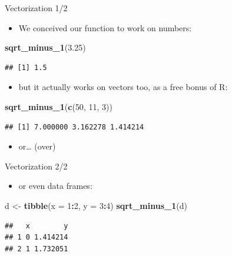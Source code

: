 \documentclass[ignorenonframetext,]{beamer}
\newenvironment{Shaded}{\begin{snugshade}}{\end{snugshade}}
\newcommand{\DataTypeTok}[1]{\textcolor[rgb]{0.13,0.29,0.53}{#1}}
\newcommand{\DecValTok}[1]{\textcolor[rgb]{0.00,0.00,0.81}{#1}}
\newcommand{\FloatTok}[1]{\textcolor[rgb]{0.00,0.00,0.81}{#1}}
\newcommand{\KeywordTok}[1]{\textcolor[rgb]{0.13,0.29,0.53}{\textbf{#1}}}
\newcommand{\NormalTok}[1]{#1}
\newcommand{\OperatorTok}[1]{\textcolor[rgb]{0.81,0.36,0.00}{\textbf{#1}}}
\newcommand{\StringTok}[1]{\textcolor[rgb]{0.31,0.60,0.02}{#1}}
\providecommand{\tightlist}{%
  \setlength{\itemsep}{0pt}\setlength{\parskip}{0pt}}
\begin{document}
\begin{frame}[fragile]{Vectorization 1/2}
\protect\hypertarget{vectorization-12}{}

\begin{itemize}
\tightlist
\item
  We conceived our function to work on numbers:
\end{itemize}

\begin{Shaded}
\begin{Highlighting}[]
\KeywordTok{sqrt_minus_1}\NormalTok{(}\FloatTok{3.25}\NormalTok{)}
\end{Highlighting}
\end{Shaded}

\begin{verbatim}
## [1] 1.5
\end{verbatim}

\begin{itemize}
\tightlist
\item
  but it actually works on vectors too, as a free bonus of R:
\end{itemize}

\begin{Shaded}
\begin{Highlighting}[]
\KeywordTok{sqrt_minus_1}\NormalTok{(}\KeywordTok{c}\NormalTok{(}\DecValTok{50}\NormalTok{, }\DecValTok{11}\NormalTok{, }\DecValTok{3}\NormalTok{))}
\end{Highlighting}
\end{Shaded}

\begin{verbatim}
## [1] 7.000000 3.162278 1.414214
\end{verbatim}

\begin{itemize}
\tightlist
\item
  or\ldots{} (over)
\end{itemize}

\end{frame}

\begin{frame}[fragile]{Vectorization 2/2}
\protect\hypertarget{vectorization-22}{}

\begin{itemize}
\tightlist
\item
  or even data frames:
\end{itemize}

\begin{Shaded}
\begin{Highlighting}[]
\NormalTok{d <-}\StringTok{ }\KeywordTok{tibble}\NormalTok{(}\DataTypeTok{x =} \DecValTok{1}\OperatorTok{:}\DecValTok{2}\NormalTok{, }\DataTypeTok{y =} \DecValTok{3}\OperatorTok{:}\DecValTok{4}\NormalTok{)}
\KeywordTok{sqrt_minus_1}\NormalTok{(d)}
\end{Highlighting}
\end{Shaded}

\begin{verbatim}
##   x        y
## 1 0 1.414214
## 2 1 1.732051
\end{verbatim}

\end{frame}
\end{document}
